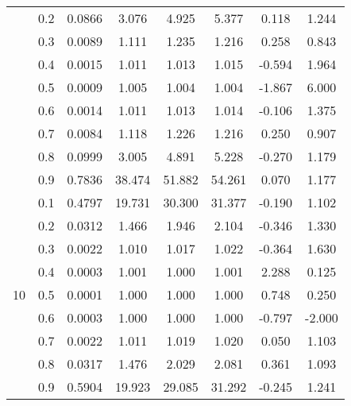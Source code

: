 \documentclass[11pt,a4paper]{report}
\begin{document}
\begin{longtable}{ | c | c || c | c | c | c | c | c | }
 & 0.2 & 0.0866 & 3.076 & 4.925 & 5.377 & 0.118 & 1.244 \\
 & 0.3 & 0.0089 & 1.111 & 1.235 & 1.216 & 0.258 & 0.843 \\
 & 0.4 & 0.0015 & 1.011 & 1.013 & 1.015 & -0.594 & 1.964 \\
 & 0.5 & 0.0009 & 1.005 & 1.004 & 1.004 & -1.867 & 6.000 \\
 & 0.6 & 0.0014 & 1.011 & 1.013 & 1.014 & -0.106 & 1.375 \\
 & 0.7 & 0.0084 & 1.118 & 1.226 & 1.216 & 0.250 & 0.907 \\
 & 0.8 & 0.0999 & 3.005 & 4.891 & 5.228 & -0.270 & 1.179 \\
 & 0.9 & 0.7836 & 38.474 & 51.882 & 54.261 & 0.070 & 1.177 \\
 \hline
\multirow{9}{*}{10} & 0.1 & 0.4797 & 19.731 & 30.300 & 31.377 & -0.190 & 1.102 \\
 & 0.2 & 0.0312 & 1.466 & 1.946 & 2.104 & -0.346 & 1.330 \\
 & 0.3 & 0.0022 & 1.010 & 1.017 & 1.022 & -0.364 & 1.630 \\
 & 0.4 & 0.0003 & 1.001 & 1.000 & 1.001 & 2.288 & 0.125 \\
 & 0.5 & 0.0001 & 1.000 & 1.000 & 1.000 & 0.748 & 0.250 \\
 & 0.6 & 0.0003 & 1.000 & 1.000 & 1.000 & -0.797 & -2.000 \\
 & 0.7 & 0.0022 & 1.011 & 1.019 & 1.020 & 0.050 & 1.103 \\
 & 0.8 & 0.0317 & 1.476 & 2.029 & 2.081 & 0.361 & 1.093 \\
 & 0.9 & 0.5904 & 19.923 & 29.085 & 31.292 & -0.245 & 1.241 \\
 \hline
\hline
\end{longtable}
\end{document}
